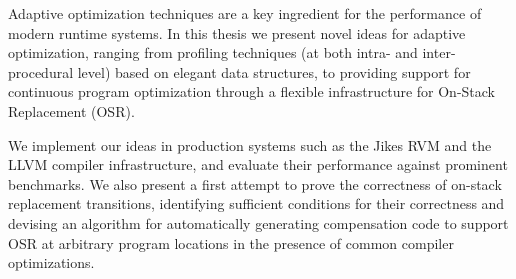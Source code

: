 Adaptive optimization techniques are a key ingredient for the performance of modern runtime systems. In this thesis we present novel ideas for adaptive optimization, ranging from profiling techniques (at both intra- and inter- procedural level) based on elegant data structures, to providing support for continuous program optimization through a flexible infrastructure for On-Stack Replacement (OSR).

We implement our ideas in production systems such as the Jikes RVM and the LLVM compiler infrastructure, and evaluate their performance against prominent benchmarks. We also present a first attempt to prove the correctness of on-stack replacement transitions, identifying sufficient conditions for their correctness and devising an algorithm for automatically generating compensation code to support OSR at arbitrary program locations in the presence of common compiler optimizations.
